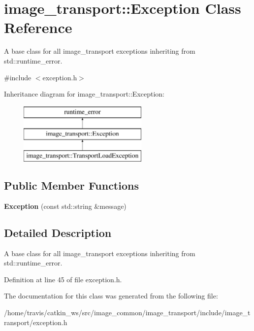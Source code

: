 \hypertarget{classimage__transport_1_1_exception}{\section{image\-\_\-transport\-:\-:Exception Class Reference}
\label{classimage__transport_1_1_exception}
}


A base class for all image\-\_\-transport exceptions inheriting from std\-::runtime\-\_\-error.  




{\ttfamily \#include $<$exception.\-h$>$}

Inheritance diagram for image\-\_\-transport\-:\-:Exception\-:\begin{figure}[H]
\begin{center}
\leavevmode
\includegraphics[height=3.000000cm]{classimage__transport_1_1_exception}
\end{center}
\end{figure}
\subsection*{Public Member Functions}
\begin{DoxyCompactItemize}
\item 
\hypertarget{classimage__transport_1_1_exception_a84e9a474ba9e6037e383264d96cec958}{{\bfseries Exception} (const std\-::string \&message)}\label{classimage__transport_1_1_exception_a84e9a474ba9e6037e383264d96cec958}

\end{DoxyCompactItemize}


\subsection{Detailed Description}
A base class for all image\-\_\-transport exceptions inheriting from std\-::runtime\-\_\-error. 

Definition at line 45 of file exception.\-h.



The documentation for this class was generated from the following file\-:\begin{DoxyCompactItemize}
\item 
/home/travis/catkin\-\_\-ws/src/image\-\_\-common/image\-\_\-transport/include/image\-\_\-transport/exception.\-h\end{DoxyCompactItemize}
